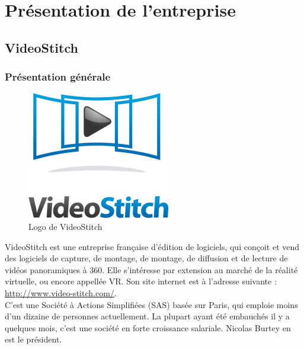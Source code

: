 \chapter{Présentation de l'entreprise}

\section{VideoStitch}
\subsection{Présentation générale}
\begin{figure}
    \includegraphics{images/videostitch.png}
    \caption{Logo de VideoStitch}
\end{figure}
VideoStitch est une entreprise française d'édition de logiciels, qui conçoit et vend des logiciels de capture, de montage, de montage, de diffusion et de lecture de vidéos panoramiques à 360\degree. Elle s'intéresse par extension au marché de la réalité virtuelle, ou encore appellée VR.
Son site internet est à l'adresse suivante : \url{http://www.video-stitch.com/}.\\
C'est une Société à Actions Simplifiées (SAS) basée sur Paris, qui emploie moins d'un dizaine de personnes actuellement. 
La plupart ayant été embauchés il y a quelques mois, c'est une société en forte croissance salariale. 
Nicolas Burtey en est le président.

